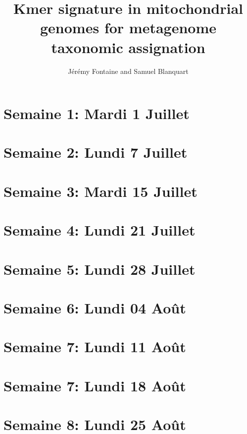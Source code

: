 \documentclass[10pt,a4paper]{article}
\title{Kmer signature in mitochondrial genomes for metagenome taxonomic assignation}
\author{Jérémy Fontaine and Samuel Blanquart}
\begin{document}
\maketitle

\section{Semaine 1: Mardi 1 Juillet}


\newpage
\section{Semaine 2: Lundi 7 Juillet}


\newpage
\section{Semaine 3: Mardi 15 Juillet}


\newpage
\section{Semaine 4: Lundi 21 Juillet}


\newpage
\section{Semaine 5: Lundi 28 Juillet}


\newpage
\section{Semaine 6: Lundi 04 Août}



\section{Semaine 7: Lundi 11 Août}


\newpage
\section{Semaine 7: Lundi 18 Août}


\newpage
\section{Semaine 8: Lundi 25 Août}

\end{document}

